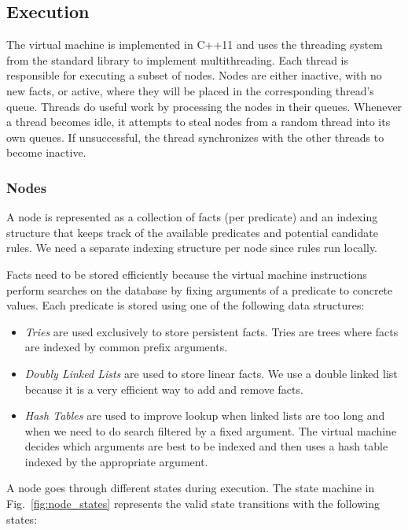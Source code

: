 \subsection{Execution}

The virtual machine is implemented in C++11 and uses the threading system from
the standard library to implement multithreading. Each thread is responsible
for executing a subset of nodes. Nodes are either inactive, with no new facts,
or active, where they will be placed in the corresponding thread's queue.
Threads do useful work by processing the nodes in their queues. Whenever a
thread becomes idle, it attempts to steal nodes from a random thread into its
own queues. If unsuccessful, the thread synchronizes with the other threads to
become inactive.

\subsubsection{Nodes}

A node is represented as a collection of facts (per predicate) and an indexing structure that
keeps track of the available predicates and potential candidate rules. We need
a separate indexing structure per node since rules run locally.

Facts need to be stored efficiently because the virtual machine instructions
perform searches on the database by fixing arguments of a predicate to concrete
values. Each predicate is stored using one of the following data structures:

\begin{itemize}
\item \emph{Tries} are used exclusively to store 
  persistent facts. Tries are trees where facts are indexed by common
  prefix arguments.
\item \emph{Doubly Linked Lists} are used to store 
  linear facts. We use a double linked list because it is a very
   efficient way to add and remove facts.
\item \emph{Hash Tables} are used to improve lookup when 
  linked lists are too long and when we need to do search filtered by
  a fixed argument. The virtual machine decides which arguments are
  best to be indexed and then uses a hash table
  indexed by the appropriate argument.
\end{itemize}

A node goes through different states during execution. The state machine in
Fig.~\ref{fig:node_states} represents the valid state transitions with the
following states:


